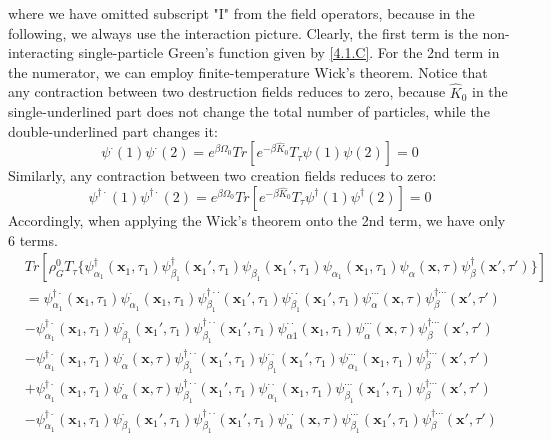 where we have omitted subscript "I" from the field operators, because in the following, we always use the interaction picture.
Clearly, the first term is the non-interacting single-particle Green's function given by \ref{4.1.C}.
For the 2nd term in the numerator, we can employ finite-temperature Wick's theorem.
Notice that any contraction between two destruction fields reduces to zero, because $\hat{K}_0$ in the single-underlined part does not change the total number of particles, while the double-underlined part changes it:
$$
\psi^\cdot(1)\psi^\cdot(2)=e^{\beta\Omega_0} Tr\left[e^{-\beta\hat{K}_0}T_\tau{\psi(1)\psi(2)}\right]=0
$$
Similarly, any contraction between two creation fields reduces to zero:
$$
\psi^{\dagger\cdot}(1)\psi^{\dagger\cdot}(2)=e^{\beta\Omega_0} Tr\left[e^{-\beta\hat{K}_0}T_\tau{\psi^\dagger(1)\psi^\dagger(2)}\right]=0
$$
Accordingly, when applying the Wick's theorem onto the 2nd term, we have only 6 terms.
$$
\begin{aligned}
&Tr\left[\rho_G^0 T_\tau \{\psi_{\alpha_1}^\dagger (\mathbf{x}_1,\tau_1) \psi_{\beta_1}^\dagger (\mathbf{x}_1',\tau_1) \psi_{\beta_1} (\mathbf{x}_1',\tau_1) \psi_{\alpha_1} (\mathbf{x}_1,\tau_1) \psi_\alpha(\mathbf{x},\tau) \psi_\beta^\dagger(\mathbf{x'},\tau')\}\right]\\
&=\psi_{\alpha_1}^{\dagger\cdot} (\mathbf{x}_1,\tau_1) \psi_{\alpha_1}^{\cdot} (\mathbf{x}_1,\tau_1) \psi_{\beta_1}^{\dagger\cdot\cdot} (\mathbf{x}_1',\tau_1) \psi_{\beta_1}^{\cdot\cdot} (\mathbf{x}_1',\tau_1) \psi_{\alpha}^{\cdots} (\mathbf{x},\tau) \psi_{\beta}^{\dagger\cdots} (\mathbf{x'},\tau')\\
&-\psi_{\alpha_1}^{\dagger\cdot} (\mathbf{x}_1,\tau_1) \psi_{\beta_1}^{\cdot} (\mathbf{x}_1',\tau_1) \psi_{\beta_1}^{\dagger\cdot\cdot} (\mathbf{x}_1',\tau_1) \psi_{\alpha1}^{\cdot\cdot} (\mathbf{x}_1,\tau_1) \psi_\alpha^{\cdots}(\mathbf{x},\tau) \psi_\beta^{\dagger\cdots}(\mathbf{x'},\tau')\\
&-\psi_{\alpha_1}^{\dagger\cdot} (\mathbf{x}_1,\tau_1) \psi_{\alpha}^{\cdot} (\mathbf{x},\tau) \psi_{\beta_1}^{\dagger\cdot\cdot} (\mathbf{x}_1',\tau_1) \psi_{\beta_1}^{\cdot\cdot} (\mathbf{x}_1',\tau_1) \psi_{\alpha_1}^{\cdots}(\mathbf{x}_1,\tau_1) \psi_\beta^{\dagger\cdots}(\mathbf{x'},\tau')\\
&+\psi_{\alpha_1}^{\dagger\cdot} (\mathbf{x}_1,\tau_1) \psi_{\alpha}^{\cdot} (\mathbf{x},\tau) \psi_{\beta_1}^{\dagger\cdot\cdot} (\mathbf{x}_1',\tau_1) \psi_{\alpha_1}^{\cdot\cdot} (\mathbf{x}_1,\tau_1) \psi_{\beta_1}^{\cdots}(\mathbf{x}_1',\tau_1) \psi_\beta^{\dagger\cdots}(\mathbf{x'},\tau')\\
&-\psi_{\alpha_1}^{\dagger\cdot} (\mathbf{x}_1,\tau_1) \psi_{\beta_1}^{\cdot} (\mathbf{x}_1',\tau_1) \psi_{\beta_1}^{\dagger\cdot\cdot} (\mathbf{x}_1',\tau_1) \psi_{\alpha}^{\cdot\cdot} (\mathbf{x},\tau) \psi_{\beta_1}^{\cdots}(\mathbf{x}_1',\tau_1) \psi_\beta^{\dagger\cdots}(\mathbf{x'},\tau')\\
\end{aligned}
$$
